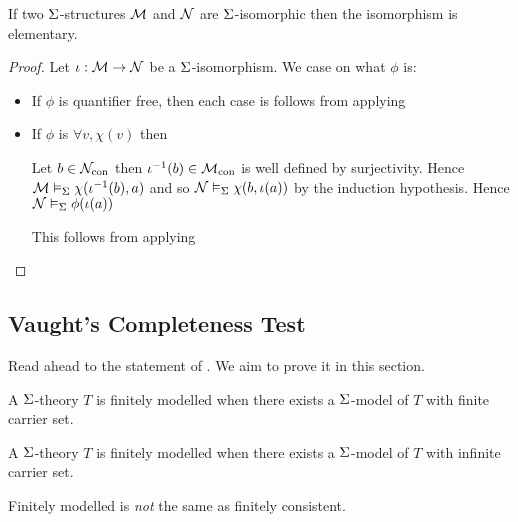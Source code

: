 \begin{prop}
    If two $\Sigma$-structures $\mathcal{M}$ and $\mathcal{N}$ 
    are $\Sigma$-isomorphic then the isomorphism is elementary.
\end{prop}
\begin{proof}
    Let $\iota : \mathcal{M} \to \mathcal{N}$ be a $\Sigma$-isomorphism.
    We case on what $\phi$ is:
    \begin{itemize}
        \item If $\phi$ is quantifier free, 
            then each case is follows from applying
        \item If $\phi$ is $\forall v, \chi(v)$ then
            \begin{forward}
                Let $b \in {\mathcal{N}}_\mathrm{con}$ then
                $\iota^{-1}(b) \in {\mathcal{M}}_\mathrm{con}$ is well defined by surjectivity.
                Hence $\mathcal{M} \vDash_{\Sigma} \chi(\iota^{-1}(b),a)$ and so
                $\mathcal{N} \vDash_{\Sigma} \chi(b,\iota(a))$ by the induction hypothesis.
                Hence $\mathcal{N} \vDash_{\Sigma} \phi(\iota(a))$
            \end{forward}
            \begin{backward}
                This follows from applying 
            \end{backward}
    \end{itemize}
\end{proof}

\subsection{Vaught's Completeness Test}
Read ahead to the statement of .
We aim to prove it in this section.

\begin{dfn}
    A $\Sigma$-theory $T$ 
    is finitely modelled when
    there exists a $\Sigma$-model of $T$ 
    with finite carrier set.

    A $\Sigma$-theory $T$ 
    is finitely modelled when
    there exists a $\Sigma$-model of $T$ 
    with infinite carrier set.
\end{dfn}
Finitely modelled is \emph{not} the same as finitely consistent.

